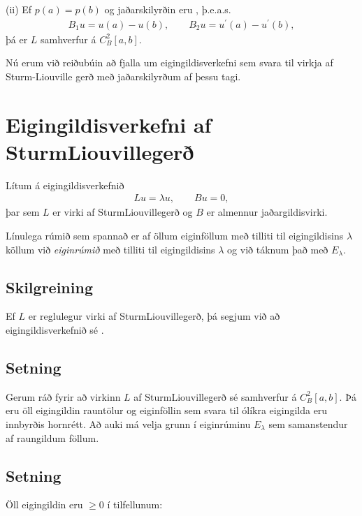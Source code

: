 \documentclass[a4paper,10pt,icelandic]{sphinxmanual}
\begin{document}
(ii) Ef \(p(a)=p(b)\) og jaðarskilyrðin eru , þ.e.a.s.
\begin{equation*}
\begin{split}B_1u=u(a)-u(b), \qquad B_2u=u{{^{\prime}}}(a)-u{{^{\prime}}}(b),\end{split}
\end{equation*}
þá er \(L\) samhverfur á \(C^2_B[a,b]\).

Nú erum við reiðubúin að fjalla um eigingildisverkefni sem svara til virkja af Sturm-Liouville gerð með jaðarskilyrðum af þessu tagi.


\section{Eigingildisverkefni af Sturm\textendash{}Liouville\textendash{}gerð}
\label{\detokenize{Kafli03:eigingildisverkefni-af-sturmliouvilleger}}
Lítum á eigingildisverkefnið
\begin{equation*}
\begin{split}Lu= {\lambda} u , \qquad Bu=0,\end{split}
\end{equation*}
þar sem \(L\) er virki af Sturm\textendash{}Liouville\textendash{}gerð og
\(B\) er almennur jaðargildisvirki.

Línulega rúmið sem spannað er af öllum eiginföllum með tilliti til eigingildisins \({\lambda}\)
köllum við \textit{eiginrúmið} með tilliti til eigingildisins
\({\lambda}\) og við táknum það með \(E_{\lambda}\).


\subsection{Skilgreining}
\label{\detokenize{Kafli03:id5}}
Ef \(L\) er reglulegur virki af Sturm\textendash{}Liouville\textendash{}gerð, þá segjum við
að eigingildisverkefnið sé .


\subsection{Setning}
\label{\detokenize{Kafli03:setning}}
Gerum ráð fyrir að virkinn \(L\) af Sturm\textendash{}Liouville\textendash{}gerð sé
samhverfur á \(C^2_B[a,b]\). Þá eru öll eigingildin rauntölur og
eiginföllin sem svara til ólíkra eigingilda eru innbyrðis hornrétt. Að auki má velja grunn í eiginrúminu \(E_\lambda\) sem samanstendur af raungildum föllum.


\subsection{Setning}
\label{\detokenize{Kafli03:id6}}
Öll eigingildin eru \(\geq 0\) í tilfellunum:
\end{document}
